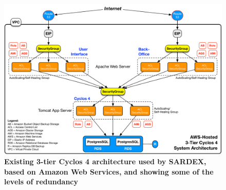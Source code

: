 \begin{figure}
\centering
\includegraphics[width=25cm]{Figures/3-Tier_Cyclos_Architecture}
\caption{\small\textbf{Existing 3-tier Cyclos 4 architecture used by SARDEX, based on Amazon Web Services, and showing some of the levels of redundancy}}
\label{cyclosarchitecture}
\end{figure}











